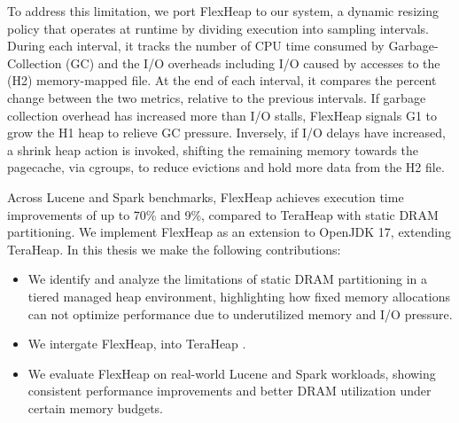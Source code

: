 To address this limitation, we port FlexHeap \cite{flexheap} to our system, a dynamic
resizing policy that operates at runtime by dividing execution into sampling
intervals. During each interval, it tracks the number of CPU time consumed by Garbage-Collection (GC)
and the I/O overheads including I/O caused by accesses to
the (H2) memory-mapped file. At the end of each interval, it compares the
percent change between the two metrics, relative to the previous intervals. If
garbage collection overhead has increased more than I/O stalls, FlexHeap
signals G1 to grow the H1 heap to relieve GC pressure. Inversely, if I/O delays
have increased, a shrink heap action is invoked, shifting the remaining memory
towards the pagecache, via cgroups, to reduce evictions and hold more data from
the H2 file.

Across Lucene and Spark benchmarks, FlexHeap achieves 
execution time improvements of up to 70\% and 9\%, compared to 
TeraHeap with static DRAM partitioning. We implement FlexHeap as an extension 
to OpenJDK 17, extending TeraHeap.
In this thesis we make the following contributions:

\vspace{0.5em}
\begin{itemize}
\item We identify and analyze the limitations of static DRAM partitioning in a tiered managed heap 
  environment, highlighting how fixed memory allocations can not optimize performance 
  due to underutilized memory and I/O pressure.

\item We intergate FlexHeap, into TeraHeap \cite{melidonis_thesis, mairh_thesis}.

\item We evaluate FlexHeap on real-world Lucene and Spark workloads, showing consistent
  performance improvements and better DRAM utilization under certain memory budgets.

\end{itemize}
